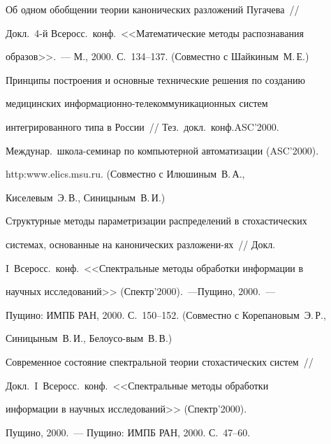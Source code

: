  Об одном обобщении теории канонических разложений Пугачева~//


Докл.\ 4-й Всеросс.\ конф.\ <<Математические методы распознавания


образов>>.~--- М., 2000. С.~134--137. (Совместно с Шайкиным~М.\,Е.)





 Принципы построения и основные технические решения по созданию


медицинских информационно-телекоммуникационных систем


интегрированного типа в России~// Тез.\ докл.\ конф.\linebreak ASC'2000.


Междунар.\ шко\-ла-се\-ми\-нар по компьютерной автоматизации (ASC'2000).


{\sf http:www.elics.msu.ru}. (Совместно с Илюшиным~В.\,А.,


Киселевым~Э.\,В., Синицыным~В.\,И.)





 Структурные методы параметризации распределений в стохастических


системах, основанные на канонических разложени-\linebreak ях~// Докл.\


I~Всеросс.\ конф.\ <<Спектральные методы обработки информации в


научных исследований>> (Спектр'2000).~---\linebreak Пущино, 2000.~---


Пущино: ИМПБ РАН, 2000. С.~150--152. (Совместно с Корепановым~Э.\,Р.,


Синицыным~В.\,И., Белоусо-\linebreak вым~В.\,В.)





 Современное состояние спектральной теории стохастических систем~//


Докл.\ I~Всеросс.\ конф.\ <<Спектральные методы обработки


информации в научных исследований>> (Спектр'2000).


Пущино, 2000.~--- Пущино: ИМПБ РАН, 2000. С.~47--60.










